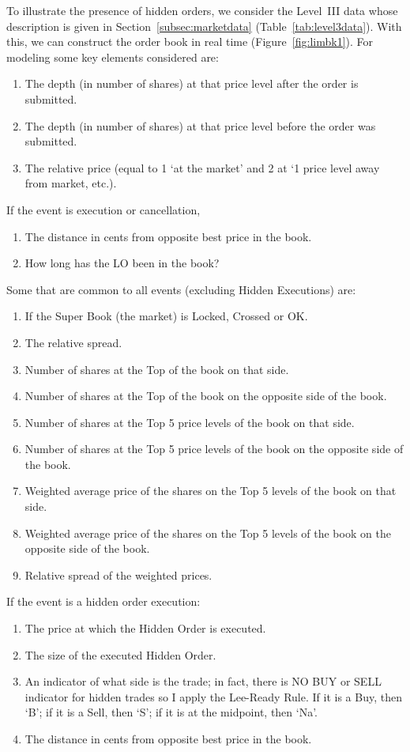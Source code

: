 To illustrate the presence of hidden orders, we consider the Level~III data whose description is given in Section~\ref{subsec:marketdata} (Table~\ref{tab:level3data}). With this, we can construct the order book in real time (Figure~\ref{fig:limbk1}). For modeling some key elements considered are:
        \begin{enumerate}[--]
        \item The depth (in number of shares) at that price level after the order is submitted.
        \item The depth (in number of shares) at that price level before the order was submitted.
        \item The relative price (equal to 1 `at the market' and 2 at `1 price level away from market, etc.). 
        \end{enumerate}
        If the event is execution or cancellation,
        \begin{enumerate}[--]
        \item The distance in cents from opposite best price in the book.
        \item How long has the LO been in the book?
        \end{enumerate}
        Some that are common to all events (excluding Hidden Executions) are:
        \begin{enumerate}[--]
        \item If the Super Book (the market) is Locked, Crossed or OK.
        \item The relative spread.
        \item Number of shares at the Top of the book on that side.
        \item Number of shares at the Top of the book on the opposite side of the book.
        \item Number of shares at the Top 5 price levels of the book on that side.
        \item Number of shares at the Top 5 price levels of the book on the opposite side of the book.
        \item Weighted average price of the shares on the Top 5 levels of the book on that side.
        \item Weighted average price of the shares on the Top 5 levels of the book on the opposite side of the book.
        \item Relative spread of the weighted prices.
        \end{enumerate}
If the event is a hidden order execution:
        \begin{enumerate}[--]
        \item The price at which the Hidden Order is executed.
        \item The size of the executed Hidden Order.
        \item An indicator of what side is the trade; in fact, there is NO BUY or SELL indicator for hidden trades so I apply the Lee-Ready Rule. If it is a Buy, then `B'; if it is a Sell, then `S'; if it is at the midpoint, then `Na'.
        \item The distance in cents from opposite best price in the book.
        \end{enumerate}


